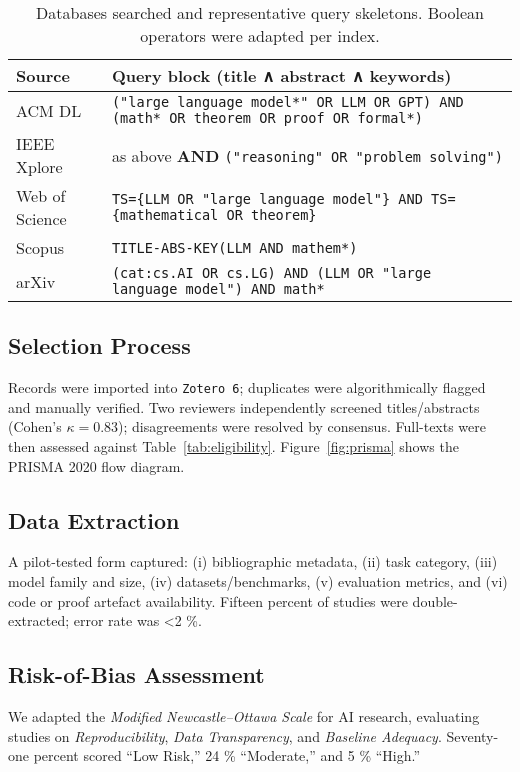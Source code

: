 \documentclass[acmsmall,anonymous]{acmart}
\begin{document}
\begin{table}[htbp]
  \centering
  \caption{Databases searched and representative query skeletons. Boolean
           operators were adapted per index.}
  \label{tab:search}
  \begin{tabular}{@{}ll@{}}
    \toprule
    \textbf{Source} & \textbf{Query block (title ∧ abstract ∧ keywords)}\\
    \midrule
    ACM DL & \texttt{("large language model*" OR LLM OR GPT) AND (math* OR theorem OR proof OR formal*)}\\[2pt]
    IEEE Xplore & as above \textbf{AND} \texttt{("reasoning" OR "problem solving")}\\[2pt]
    Web of Science & \texttt{TS=\{LLM OR "large language model"\} AND TS=\{mathematical OR theorem\}}\\[2pt]
    Scopus & \texttt{TITLE-ABS-KEY(LLM AND mathem*)}\\[2pt]
    arXiv & \texttt{(cat:cs.AI OR cs.LG) AND (LLM OR "large language model") AND math*}\\
    \bottomrule
  \end{tabular}
\end{table}

\subsection{Selection Process}
Records were imported into \verb|Zotero 6|; duplicates were
algorithmically flagged and manually verified.
Two reviewers independently screened titles/abstracts
(Cohen’s $\kappa = 0.83$); disagreements were resolved by consensus.
Full-texts were then assessed against Table~\ref{tab:eligibility}.
Figure~\ref{fig:prisma} shows the PRISMA 2020 flow diagram.

\subsection{Data Extraction}
A pilot-tested form captured:
(i) bibliographic metadata, (ii) task category,
(iii) model family and size, (iv) datasets/benchmarks,
(v) evaluation metrics, and (vi) code or proof artefact availability.
Fifteen percent of studies were double-extracted; error rate was <2 \%.

\subsection{Risk-of-Bias Assessment}
We adapted the \emph{Modified Newcastle–Ottawa Scale} for AI research, evaluating studies on \emph{Reproducibility}, \emph{Data Transparency}, and
\emph{Baseline Adequacy}.  
Seventy-one percent scored “Low Risk,” 24 \% “Moderate,” and 5 \% “High.”
\end{document}
